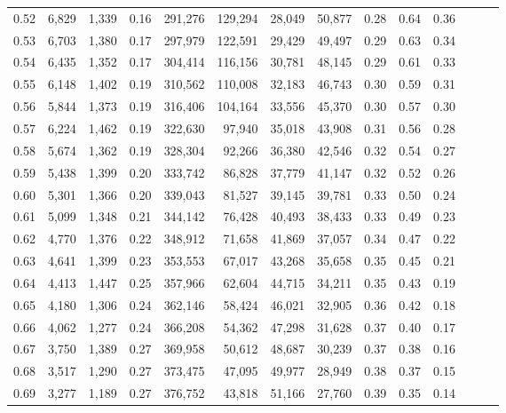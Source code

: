 \begin{tabular}{rrrrrrrrrrrrrr}
0.52 &   6,829 &  1,339 &  0.16 &  291,276 &  129,294 &  28,049 &  50,877 &  0.28 &  0.64 &      0.36 \\
0.53 &   6,703 &  1,380 &  0.17 &  297,979 &  122,591 &  29,429 &  49,497 &  0.29 &  0.63 &      0.34 \\
0.54 &   6,435 &  1,352 &  0.17 &  304,414 &  116,156 &  30,781 &  48,145 &  0.29 &  0.61 &      0.33 \\
0.55 &   6,148 &  1,402 &  0.19 &  310,562 &  110,008 &  32,183 &  46,743 &  0.30 &  0.59 &      0.31 \\
0.56 &   5,844 &  1,373 &  0.19 &  316,406 &  104,164 &  33,556 &  45,370 &  0.30 &  0.57 &      0.30 \\
0.57 &   6,224 &  1,462 &  0.19 &  322,630 &   97,940 &  35,018 &  43,908 &  0.31 &  0.56 &      0.28 \\
0.58 &   5,674 &  1,362 &  0.19 &  328,304 &   92,266 &  36,380 &  42,546 &  0.32 &  0.54 &      0.27 \\
0.59 &   5,438 &  1,399 &  0.20 &  333,742 &   86,828 &  37,779 &  41,147 &  0.32 &  0.52 &      0.26 \\
0.60 &   5,301 &  1,366 &  0.20 &  339,043 &   81,527 &  39,145 &  39,781 &  0.33 &  0.50 &      0.24 \\
0.61 &   5,099 &  1,348 &  0.21 &  344,142 &   76,428 &  40,493 &  38,433 &  0.33 &  0.49 &      0.23 \\
0.62 &   4,770 &  1,376 &  0.22 &  348,912 &   71,658 &  41,869 &  37,057 &  0.34 &  0.47 &      0.22 \\
0.63 &   4,641 &  1,399 &  0.23 &  353,553 &   67,017 &  43,268 &  35,658 &  0.35 &  0.45 &      0.21 \\
0.64 &   4,413 &  1,447 &  0.25 &  357,966 &   62,604 &  44,715 &  34,211 &  0.35 &  0.43 &      0.19 \\
0.65 &   4,180 &  1,306 &  0.24 &  362,146 &   58,424 &  46,021 &  32,905 &  0.36 &  0.42 &      0.18 \\
0.66 &   4,062 &  1,277 &  0.24 &  366,208 &   54,362 &  47,298 &  31,628 &  0.37 &  0.40 &      0.17 \\
0.67 &   3,750 &  1,389 &  0.27 &  369,958 &   50,612 &  48,687 &  30,239 &  0.37 &  0.38 &      0.16 \\
0.68 &   3,517 &  1,290 &  0.27 &  373,475 &   47,095 &  49,977 &  28,949 &  0.38 &  0.37 &      0.15 \\
0.69 &   3,277 &  1,189 &  0.27 &  376,752 &   43,818 &  51,166 &  27,760 &  0.39 &  0.35 &      0.14 \\

\end{tabular}
